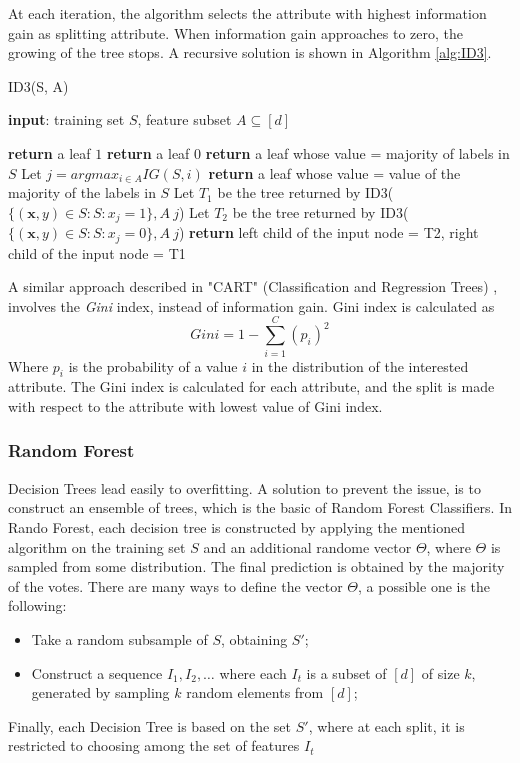 At each iteration, the algorithm selects the attribute with highest information gain as splitting attribute. When information gain approaches to zero, the growing of the tree stops. A recursive solution is shown in Algorithm \ref{alg:ID3}.

\begin{algorithm}
	\caption{ID3(S, A)}
	\label{alg:ID3}
	\begin{algorithmic}[1]
		\State \textbf{input}: training set $S$, feature subset $A \subseteq [d]$
		
		\State \textbf{return} a leaf $1$
		\EndIf
		\State \textbf{return} a leaf $0$
		\EndIf
		\State \textbf{return} a leaf whose value = majority of labels in $S$
		\Else
		\State Let $j = argmax_{i \in A} IG(S, i)$
		\State \textbf{return} a leaf whose value = value of the majority of the labels in $S$
		\Else
		\State Let $T_1$ be the tree returned by ID3($\{(\mathbf{x}, y) \in S : S: x_j = 1\}, A \ {j}$)
		\State Let $T_2$ be the tree returned by ID3($\{(\mathbf{x}, y) \in S : S: x_j = 0\}, A \ {j}$)
		\State \textbf{return} left child of the input node = T2, right child of the input node = T1
		\EndIf
		\EndIf

	\end{algorithmic}
\end{algorithm}

A similar approach described in "CART" (Classification and Regression Trees) \cite{cart84}, involves the \textit{Gini} index, instead of information gain. Gini index is calculated as 
\[ Gini = 1 - \sum_{i=1}^{C} (p_i)^2 \]
Where $p_i$ is the probability of a value $i$ in the distribution of the interested attribute. The Gini index is calculated for each attribute, and the split is made with respect to the attribute with lowest value of Gini index.


\subsubsection{Random Forest}
Decision Trees lead easily to overfitting. A solution to prevent the issue, is to construct an ensemble of trees, which is the basic of Random Forest Classifiers. In Rando Forest, each decision tree is constructed by applying the mentioned algorithm on the training set $S$ and an additional randome vector $\Theta$, where $\Theta$ is sampled from some distribution. The final prediction is obtained by the majority of the votes. There are many ways to define the vector $\Theta$, a possible one is the following:
\begin{itemize}
	\item Take a random subsample of $S$, obtaining $S'$;
	\item Construct a sequence $I_1, I_2, \dots$ where each $I_t$ is a subset of $[d]$ of size $k$, generated by sampling $k$ random elements from $[d]$;
\end{itemize}
Finally, each Decision Tree is based on the set $S'$, where at each split, it is restricted to choosing among the set of features $I_t$



